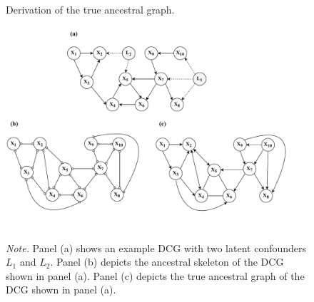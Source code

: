 \documentclass[twoside, 11pt]{article}
\newcommand{\tailarrow}{%
\begin{tikzpicture}
    \draw [-{Straight Barb[length=2.5pt]}](0,0) -- (0.4, 0);
\end{tikzpicture}
}
\newcommand{\arrowarrow}{%
\begin{tikzpicture}
    \draw [{Straight Barb[length=2.5pt]}-{Straight Barb[length=2.5pt]}](0,0) -- (0.4, 0);
\end{tikzpicture}
}
\newcommand*{\figref}[2][]{%
  \hyperref[{fig:#2}]{%
    Figure~\ref*{fig:#2}%
    \ifx\\#1\\%
    \else
      #1%
    \fi
  }%
}
\begin{document}
\begin{appendices}



\begin{figure}[H]
    \centering
        \caption{Derivation of the true ancestral graph.}
        \includegraphics[width=1\textwidth]{figures/FigE1.pdf}
        \vspace{-3mm}
        \caption*{\small{\textit{Note.} Panel (a) shows an example DCG with two latent confounders $L_1$ and $L_2$. Panel (b) depicts the ancestral skeleton of the DCG shown in panel (a). Panel (c) depicts the true ancestral graph of the DCG shown in panel (a).}}
        \vspace{1mm}
    \label{fig:D1}
\end{figure}




\end{appendices}
\end{document}
